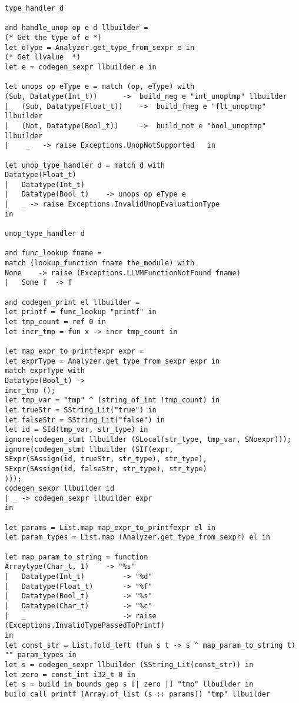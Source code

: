 \begin{verbatim}
type_handler d

and handle_unop op e d llbuilder =
(* Get the type of e *) 
let eType = Analyzer.get_type_from_sexpr e in
(* Get llvalue  *)
let e = codegen_sexpr llbuilder e in

let unops op eType e = match (op, eType) with
(Sub, Datatype(Int_t)) 		->  build_neg e "int_unoptmp" llbuilder
|   (Sub, Datatype(Float_t)) 	-> 	build_fneg e "flt_unoptmp" llbuilder
|   (Not, Datatype(Bool_t)) 	->  build_not e "bool_unoptmp" llbuilder
|    _ 	 -> raise Exceptions.UnopNotSupported	in

let unop_type_handler d = match d with
Datatype(Float_t)   
|	Datatype(Int_t)		
|   Datatype(Bool_t)	-> unops op eType e
|   _ -> raise Exceptions.InvalidUnopEvaluationType
in

unop_type_handler d

and func_lookup fname = 
match (lookup_function fname the_module) with
None 	-> raise (Exceptions.LLVMFunctionNotFound fname)
|  	Some f 	-> f

and codegen_print el llbuilder = 
let printf = func_lookup "printf" in
let tmp_count = ref 0 in
let incr_tmp = fun x -> incr tmp_count in

let map_expr_to_printfexpr expr = 
let exprType = Analyzer.get_type_from_sexpr expr in
match exprType with 
Datatype(Bool_t) ->
incr_tmp ();
let tmp_var = "tmp" ^ (string_of_int !tmp_count) in
let trueStr = SString_Lit("true") in
let falseStr = SString_Lit("false") in
let id = SId(tmp_var, str_type) in 
ignore(codegen_stmt llbuilder (SLocal(str_type, tmp_var, SNoexpr)));
ignore(codegen_stmt llbuilder (SIf(expr, 
SExpr(SAssign(id, trueStr, str_type), str_type), 
SExpr(SAssign(id, falseStr, str_type), str_type)
)));
codegen_sexpr llbuilder id
| _ -> codegen_sexpr llbuilder expr
in

let params = List.map map_expr_to_printfexpr el in
let param_types = List.map (Analyzer.get_type_from_sexpr) el in 

let map_param_to_string = function 
Arraytype(Char_t, 1) 	-> "%s"
| 	Datatype(Int_t) 		-> "%d"
| 	Datatype(Float_t) 		-> "%f"
| 	Datatype(Bool_t) 		-> "%s"
| 	Datatype(Char_t) 		-> "%c"
| 	_ 						-> raise (Exceptions.InvalidTypePassedToPrintf)
in 
let const_str = List.fold_left (fun s t -> s ^ map_param_to_string t) "" param_types in
let s = codegen_sexpr llbuilder (SString_Lit(const_str)) in
let zero = const_int i32_t 0 in 
let s = build_in_bounds_gep s [| zero |] "tmp" llbuilder in
build_call printf (Array.of_list (s :: params)) "tmp" llbuilder


\end{verbatim}

